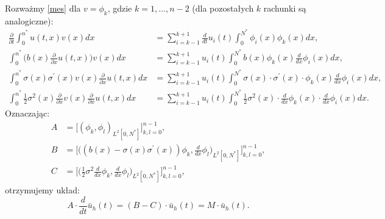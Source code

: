 \documentclass{article}
\begin{document}
Rozważmy \eqref{mes} dla $v=\phi_k$, gdzie $k=1,\dots,n-2$ (dla pozostałych $k$ rachunki są analogiczne):
\begin{align*}
\frac{\partial}{\partial t} \int_{0}^{n^{*}} u(t,x) v(x) dx &= 
\sum_{i = k-1}^{k+1} \frac{d}{d t} u_i (t) \int_{0}^{N^{*}} \phi_i (x) \phi_k (x) dx,
\\
\int_{0}^{n^{*}} \Big( b(x) \frac{\partial}{\partial x} u(t, x)\Big) v(x) dx &= \sum_{i = k-1}^{k+1} u_i (t) \int_{0}^{N^{*}} b(x) \phi_k (x)  \frac{d}{d x} \phi_i (x)  dx,
\\
\int_{0}^{n^{*}}\sigma(x) \sigma^{'}(x) v(x)\frac{\partial}{\partial x} u(t,x) dx &= 
\sum_{i = k-1}^{k+1} u_i (t) \int_{0}^{N^{*}} \sigma(x) \cdot \sigma^{'}(x) \cdot \phi_k (x) \frac{d}{d x} \phi_i (x) dx,
\\
\int_{0}^{n^{*}}\frac{1}{2} \sigma^{2}(x)  \frac{\partial}{\partial x} v(x)\frac{\partial}{\partial x} u(t,x) dx &= 
\sum_{i = k-1}^{k+1} u_i (t) \int_{0}^{N^{*}} \frac{1}{2} \sigma^{2}(x) \cdot \frac{d}{d x} \phi_k (x) \cdot \frac{d}{d x} \phi_i (x) dx.
\end{align*}
Oznaczając:
\begin{equation}\label{mes macierze}
\begin{aligned}
A &= \big[(\phi_k, \phi_l)_{L^{2}[0,N^{*}]}\big]_{k,l = 0}^{n-1},\\
B &= \big[\big((b(x) - \sigma(x) \sigma^{'}(x))\phi_k, \frac{d}{dx}\phi_l\big)_{L^{2}[0,N^{*}]}\big]_{k,l = 0}^{n-1},\\
C &= \big[\big(\frac{1}{2}\sigma^{2}\frac{d}{dx} \phi_k, \frac{d}{dx}\phi_l\big)_{L^{2}[0,N^{*}]}\big]_{k,l = 0}^{n-1},
\end{aligned}
\end{equation}
otrzymujemy układ:
\begin{equation*}
A \cdot \frac{d}{dt}\bar{u}_h (t) = (B - C) \cdot \bar{u}_h (t) = M \cdot \bar{u}_h (t).
\end{equation*}
\end{document}
